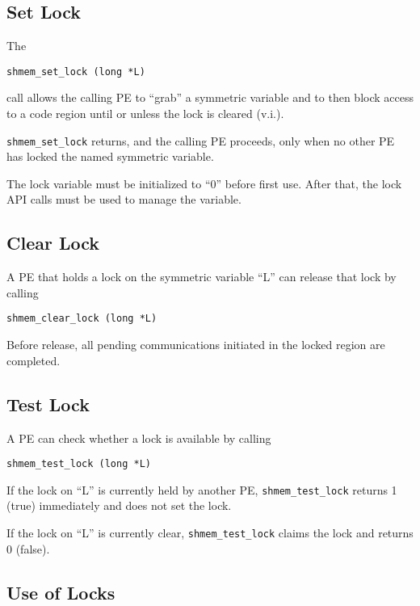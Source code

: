 \subsection{Set Lock}

The

\begin{verbatim}
shmem_set_lock (long *L)
\end{verbatim}


call allows the calling PE to ``grab'' a symmetric variable and to
then block access to a code region until or unless the lock is cleared
(v.i.).

\texttt{shmem\_set\_lock} returns, and the calling PE proceeds, only
when no other PE has locked the named symmetric variable.

The lock variable must be initialized to ``0'' before first use.
After that, the lock API calls must be used to manage the variable.


\subsection{Clear Lock}

A PE that holds a lock on the symmetric variable ``L'' can release
that lock by calling

\begin{verbatim}
shmem_clear_lock (long *L)
\end{verbatim}

Before release, all pending \openshmem communications initiated in the
locked region are completed.

\subsection{Test Lock}

A PE can check whether a lock is available by calling

\begin{verbatim}
shmem_test_lock (long *L)
\end{verbatim}

If the lock on ``L'' is currently held by another PE,
\texttt{shmem\_test\_lock} returns 1 (true) immediately and does not
set the lock.

If the lock on ``L'' is currently clear, \texttt{shmem\_test\_lock}
claims the lock and returns 0 (false).

\subsection{Use of Locks}

